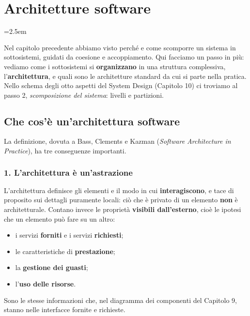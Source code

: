 \chapter{Architetture software}
\emergencystretch=2.5em

Nel capitolo precedente abbiamo visto perché e come scomporre un sistema in sottosistemi, guidati da coesione e
accoppiamento. Qui facciamo un passo in più: vediamo come i sottosistemi si \textbf{organizzano} in una struttura
complessiva, l'\textbf{architettura}, e quali sono le architetture standard da cui si parte nella pratica. Nello schema degli
otto aspetti del System Design (Capitolo 10) ci troviamo al passo 2, \textit{scomposizione del sistema}: livelli e partizioni.

\section{Che cos'è un'architettura software}


La definizione, dovuta a Bass, Clements e Kazman (\textit{Software Architecture in Practice}), ha tre conseguenze
importanti.

\subsection{1. L'architettura è un'astrazione}

L'architettura definisce gli elementi e il modo in cui \textbf{interagiscono}, e tace di proposito sui dettagli puramente
locali: ciò che è privato di un elemento \textbf{non} è architetturale. Contano invece le proprietà \textbf{visibili
dall'esterno}, cioè le ipotesi che un elemento può fare su un altro:
\begin{itemize}
  \item i servizi \textbf{forniti} e i servizi \textbf{richiesti};
  \item le caratteristiche di \textbf{prestazione};
  \item la \textbf{gestione dei guasti};
  \item l'\textbf{uso delle risorse}.
\end{itemize}
Sono le stesse informazioni che, nel diagramma dei componenti del Capitolo 9, stanno nelle interfacce fornite e richieste.

